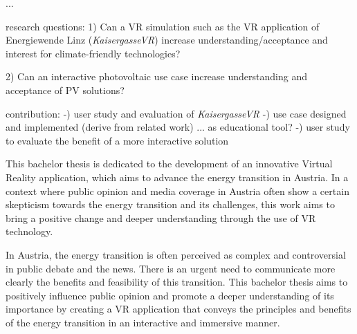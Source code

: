 \documentclass[draft, final]{vutinfth} %
\begin{document}
...

research questions:
1) Can a VR simulation such as the VR application of Energiewende Linz (\textit{KaisergasseVR}) increase understanding/acceptance  and interest for climate-friendly technologies? 

2) Can an interactive photovoltaic use case increase understanding and acceptance of PV solutions?











contribution:
-) user study and evaluation of \textit{KaisergasseVR}
-) use case designed and implemented (derive from related work) ... as educational tool?
-) user study to evaluate the benefit of a more interactive solution










This bachelor thesis is dedicated to the development of an innovative Virtual Reality application, which aims to advance the energy transition in Austria. In a context where public opinion and media coverage in Austria often show a certain skepticism towards the energy transition and its challenges, this work aims to bring a positive change and deeper understanding through the use of VR technology.

In Austria, the energy transition is often perceived as complex and controversial in public debate and the news. There is an urgent need to communicate more clearly the benefits and feasibility of this transition. This bachelor thesis aims to positively influence public opinion and promote a deeper understanding of its importance by creating a VR application that conveys the principles and benefits of the energy transition in an interactive and immersive manner.
\end{document}
